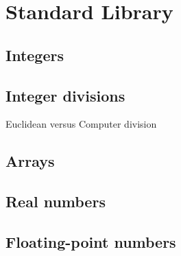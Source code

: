 \chapter{Standard Library}
\label{chap:library}

\section{Integers}

\section{Integer divisions}

Euclidean versus Computer division

\section{Arrays}

\section{Real numbers}

\section{Floating-point numbers}

\cite{ayad10ijcar}


